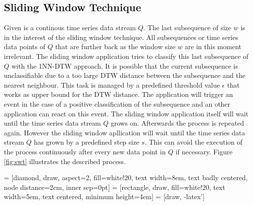 \subsection{Sliding Window Technique} \label{sliding_window_technique}
Given is a continous time series data stream $Q$. The last subsequence of size $w$ is in the interest of the sliding
window technique. All subsequences or time series data points of $Q$ that are further back as the window size $w$ are in
this moment irrelevant. The sliding window application tries to classify this last subsequence of $Q$ with the 1NN-DTW
approach. It is possible that the current subsequence is unclassifiable due to a too large DTW distance between the
subsequence and the nearest neighbour. This task is managed by a predefined threshold value $\epsilon$ that works as
upper bound for the DTW distance. The application will trigger an event in the case of a positive classification of the
subsequence and an other application can react on this event. The sliding window application itself will wait until the
time series data stream $Q$ grows on. Afterwards the process is repeated again. However the sliding window apllication
will wait until the time series data stream $Q$ has grown by a predefined step size $s$. This can avoid the execution
of the process continuously after every new data point in $Q$ if necessary. Figure \ref{fig:swt} illustrates the
described process.

 = [diamond, draw, aspect=2, fill=white!20, text width=8em, text badly centered, node distance=2cm, inner sep=0pt]
 = [rectangle, draw, fill=white!20, text width=5em, text centered, minimum height=4em]
 = [draw, -latex']

